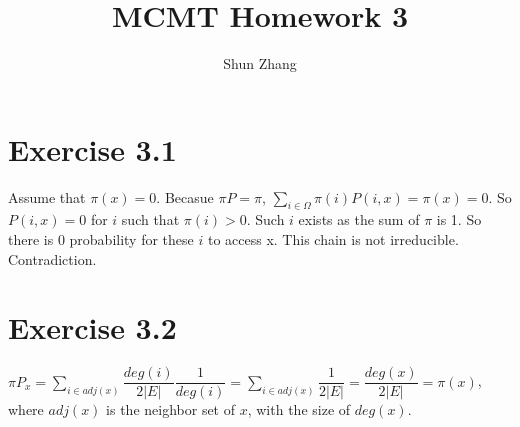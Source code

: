 \documentclass[10pt]{article}
\title{MCMT Homework 3}
\author{Shun Zhang}
\date{}
\begin{document}
\maketitle

\section*{Exercise 3.1}

Assume that $\pi(x) = 0$. Becasue $\pi P = \pi$,
$\sum_{i \in \Omega} \pi(i) P(i, x) = \pi(x) = 0$.
So $P(i, x) = 0$ for $i$ such that $\pi(i) > 0$.
Such $i$ exists as the sum of $\pi$ is 1.
So there is 0 probability for these $i$ to access x.
This chain is not irreducible. Contradiction.

\section*{Exercise 3.2}

$\pi P_x = \sum_{i \in adj(x)} \dfrac{deg(i)}{2|E|} \dfrac{1}{deg(i)}
= \sum_{i \in adj(x)} \dfrac{1}{2|E|}
= \dfrac{deg(x)}{2|E|}
= \pi(x)
$, where $adj(x)$ is the neighbor set of $x$, with the size of $deg(x)$.
\end{document}
